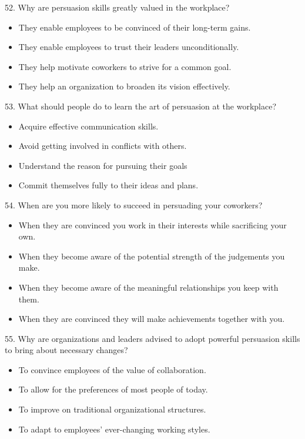 \documentclass[UTF8,11pt]{ctexart}
\begin{document}
52. Why are persuasion skills greatly valued in the workplace?


\begin{itemize}[leftmargin=2em,itemsep=.2em,topsep=.4em]\item[A.] They enable employees to be convinced of their long-term gains.
\item[B.] They enable employees to trust their leaders unconditionally.
\item[C.] They help motivate coworkers to strive for a common goal.
\item[D.] They help an organization to broaden its vision effectively.
\end{itemize}

53. What should people do to learn the art of persuasion at the workplace?


\begin{itemize}[leftmargin=2em,itemsep=.2em,topsep=.4em]\item[A.] Acquire effective communication skills.
\item[B.] Avoid getting involved in conflicts with others.
\item[C.] Understand the reason for pursuing their goals
\item[D.] Commit themselves fully to their ideas and plans.
\end{itemize}

54. When are you more likely to succeed in persuading your coworkers?


\begin{itemize}[leftmargin=2em,itemsep=.2em,topsep=.4em]\item[A.] When they are convinced you work in their interests while sacrificing your own.
\item[B.] When they become aware of the potential strength of the judgements you make.
\item[C.] When they become aware of the meaningful relationships you keep with them.
\item[D.] When they are convinced they will make achievements together with you.
\end{itemize}

55. Why are organizations and leaders advised to adopt powerful persuasion skills to bring about necessary changes?


\begin{itemize}[leftmargin=2em,itemsep=.2em,topsep=.4em]\item[A.] To convince employees of the value of collaboration.
\item[B.] To allow for the preferences of most people of today.
\item[C.] To improve on traditional organizational structures.
\item[D.] To adapt to employees’ ever-changing working styles.
\end{itemize}
\end{document}
